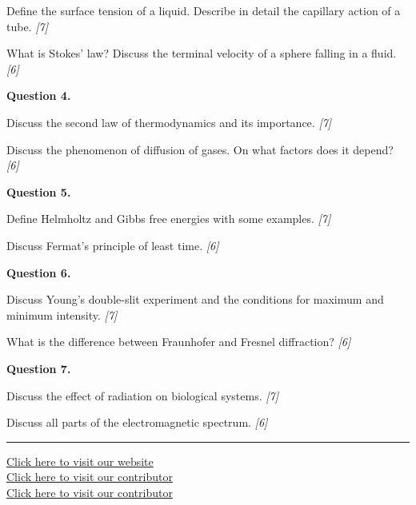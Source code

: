 \documentclass[11pt,a4paper]{article}
\newcommand{\pts}[1]{\hfill   \textit{[#1]}}
\begin{document}
\begin{parts}
  \item Define the surface tension of a liquid. Describe in detail the capillary action of a tube. \pts{7}
  \item What is Stokes' law? Discuss the terminal velocity of a sphere falling in a fluid. \pts{6}
\end{parts}

\medskip


\noindent   \textbf{Question 4.}

\begin{parts}
  \item Discuss the second law of thermodynamics and its importance. \pts{7}
  \item Discuss the phenomenon of diffusion of gases. On what factors does it depend? \pts{6}
\end{parts}

\medskip


\noindent   \textbf{Question 5.}

\begin{parts}
  \item Define Helmholtz and Gibbs free energies with some examples. \pts{7}
  \item Discuss Fermat's principle of least time. \pts{6}
\end{parts}

\medskip


\noindent   \textbf{Question 6.}

\begin{parts}
  \item Discuss Young's double-slit experiment and the conditions for maximum and minimum intensity. \pts{7}
  \item What is the difference between Fraunhofer and Fresnel diffraction? \pts{6}
\end{parts}

\medskip


\noindent   \textbf{Question 7.}

\begin{parts}
  \item Discuss the effect of radiation on biological systems. \pts{7}
  \item Discuss all parts of the electromagnetic spectrum. \pts{6}
\end{parts}

\vfill
\rule{\linewidth}{0.4pt}

\begin{center}\small
  \href{https://bhu-exam.vercel.app/}{Click here to visit our website}\\[4pt]
  \href{https://me-aryan.vercel.app/}{Click here to visit our contributor}\\[4pt]
  \href{https://quashan-me.vercel.app/}{Click here to visit our contributor}
\end{center}
\end{document}
